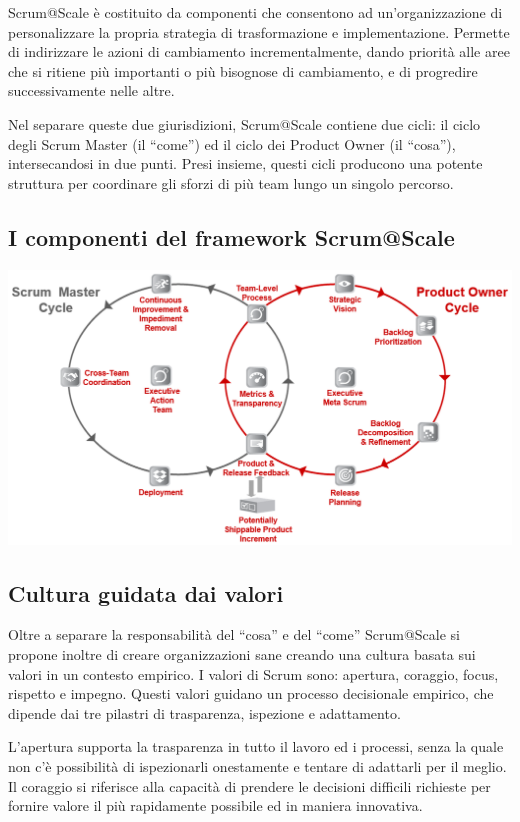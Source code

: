 \documentclass[12pt,a4paper,parskip=full]{scrartcl}
\begin{document}
Scrum@Scale è costituito da componenti che consentono ad un'organizzazione di personalizzare la propria strategia di trasformazione e implementazione. Permette di indirizzare le azioni di cambiamento incrementalmente, dando priorità alle aree che si ritiene più importanti o più bisognose di cambiamento, e di progredire successivamente nelle altre.

Nel separare queste due giurisdizioni, Scrum@Scale contiene due cicli: il ciclo degli Scrum Master (il ``come'') ed il ciclo dei Product Owner (il ``cosa''), intersecandosi in due punti. Presi insieme, questi cicli producono una potente struttura per coordinare gli sforzi di più team lungo un singolo percorso.

\subsection{I componenti del framework Scrum@Scale\textregistered}

\includegraphics[width=1.0\linewidth]{SMPO-Cycle.png}

\subsection{Cultura guidata dai valori}

Oltre a separare la responsabilità del ``cosa'' e del ``come'' Scrum@Scale si propone inoltre di creare organizzazioni sane creando una cultura basata sui valori in un contesto empirico. I valori di Scrum sono: apertura, coraggio, focus, rispetto e impegno. Questi valori guidano un processo decisionale empirico, che dipende dai tre pilastri di trasparenza, ispezione e adattamento.

L'apertura supporta la trasparenza in tutto il lavoro ed i processi, senza la quale non c'è possibilità di ispezionarli onestamente e tentare di adattarli per il meglio. Il coraggio si riferisce alla capacità di prendere le decisioni difficili richieste per fornire valore il più rapidamente possibile ed in maniera innovativa.
\end{document}
